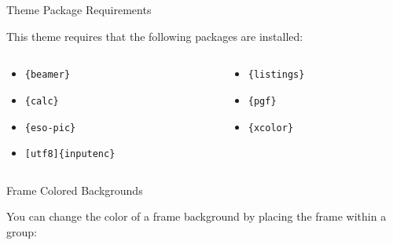 \documentclass[newPxFont]{beamer}
\begin{document}

\begin{frame}[containsverbatim]{Theme Package Requirements}

This theme requires that the following packages are installed:

\begin{columns}[t]
\begin{column}{0.5\textwidth}
\begin{itemize}
\item \lstinline!{beamer}!
\item \lstinline!{calc}!
\item \lstinline!{eso-pic}!
\item \lstinline![utf8]{inputenc}!
\end{itemize}
\end{column}

\begin{column}{0.5\textwidth}
\begin{itemize}
\item \lstinline!{listings}!
\item \lstinline!{pgf}!
\item \lstinline!{xcolor}!
\end{itemize}
\end{column}
\end{columns}

\end{frame}


\begingroup
{}
\begin{frame}[containsverbatim]{Frame Colored Backgrounds}

You can change the color of a frame background by placing the frame within a group:

\begin{sthlmLatex}

\begingroup
{}
\begin{frame}
\end{frame}
\endgroup
\end{sthlmLatex}

\end{frame}
\endgroup
\end{document}
